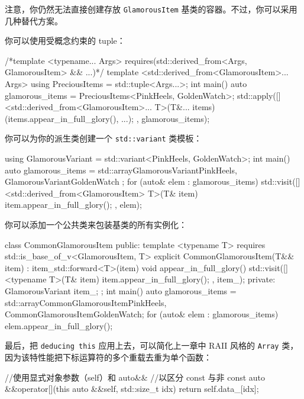 \label{idx:562}
注意，你仍然无法直接创建存放 \texttt{Glamorous\allowbreak{}Item} 基类的容器。不过，你可以采用几种替代方案。

你可以使用受概念约束的 tuple：

\begin{codebox}[cpp]
/*template <typename... Args> requires(std::derived_from<Args, GlamorousItem> && ...)*/
template <std::derived_from<GlamorousItem>... Args>
using PreciousItems = std::tuple<Args...>;
int main() {
    auto glamorous_items = PreciousItems<PinkHeels, GoldenWatch>{};
    std::apply([]<std::derived_from<GlamorousItem>... T>(T&... items) { (items.appear_in_full_glory(), ...);
    },
    glamorous_items);
}
\end{codebox}

你可以为你的派生类创建一个 \texttt{std::\allowbreak{}variant} 类模板：

\begin{codebox}[cpp]
using GlamorousVariant = std::variant<PinkHeels, GoldenWatch>;
int main() {
    auto glamorous_items = std::array{GlamorousVariant{PinkHeels{}}, GlamorousVariant{GoldenWatch{}}
    };
    for (auto& elem : glamorous_items) {
        std::visit([]<std::derived_from<GlamorousItem> T>(T& item) { item.appear_in_full_glory();
        },
        elem);
    }
}
\end{codebox}

\label{idx:563}
你可以添加一个公共类来包装基类的所有实例化：

\begin{codebox}[cpp]
class CommonGlamorousItem {
public:
    template <typename T>
        requires std::is_base_of_v<GlamorousItem, T>
    explicit CommonGlamorousItem(T&& item) : item_{std::forward<T>(item)} {}
    void appear_in_full_glory() {
        std::visit([]<typename T>(T& item) { item.appear_in_full_glory(); }, item_);
    }
private:
    GlamorousVariant item_;
};
int main() {
    auto glamorous_items = std::array{CommonGlamorousItem{PinkHeels{}}, CommonGlamorousItem{GoldenWatch{}}};
    for (auto& elem : glamorous_items) {
        elem.appear_in_full_glory();
    }
}
\end{codebox}

\label{idx:564}
最后，把 \texttt{deducing this} 应用上去，可以简化上一章中 RAII 风格的 \texttt{Array} 类，因为该特性能把下标运算符的多个重载去重为单个函数：

\begin{codebox}[cpp]
//使用显式对象参数（self）和 auto&&
//以区分 const 与非 const
auto &&operator[](this auto &&self, std::size_t idx) {
    return self.data_[idx];
}
\end{codebox}

